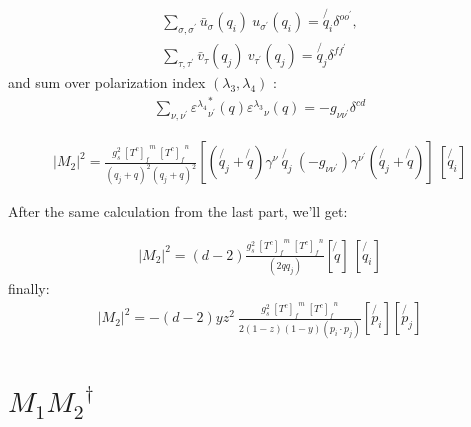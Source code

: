 \begin{equation}
\begin{split}
\displaystyle\sum\limits_{{\sigma},{\sigma}^{\prime}} {\bar{u}}_{\sigma}(q_i)\:u_{{\sigma}^{\prime}}(q_i) = \not{q_i} \delta^{{o}{o}^{\prime}},\\
\displaystyle\sum\limits_{{\tau},{\tau}^{\prime}} {\bar{v}}_{\tau}(q_j)\:v_{{\tau}^{\prime}}(q_j) = \not{q_j} \delta^{{f}{f}^{\prime}}
\end{split}
\end{equation}
and sum over polarization index $({\lambda_{3}},{\lambda}_{4})$ :
\begin{equation}
\begin{split}
 \displaystyle\sum\limits_{{\nu},{\nu}^{\prime}} {{\varepsilon^{\lambda_4}}_{{\nu}^{\prime}}^* (q) {\varepsilon^{\lambda_3}}_{\nu} (q)} = -g_{{\nu}{\nu}^{\prime}} \delta^{{c}{d}}
\end{split}
\end{equation}

\begin{equation}
\begin{split}
|M_2|^2 =\frac{g_s^2 \: {[T^c]_f}^m \: {[T^c]_{f}}^n }{(q_j + q)^2 (q_j + q)^2} [(\not{q_j} + \not{q}) \gamma^{\nu}  \:\not{q_j}\: (-g_{{\nu}{{\nu}^{\prime}}}) \gamma^{{\nu}^{\prime}}(\not{q_j} + \not{q})]\: 
[\not{q_i} ]
\end{split}
\end{equation}

After the same calculation from the last part, we'll get:

\begin{equation}
\begin{split}
|M_2|^2 =(d-2) \frac{g_s^2 \: {[T^c]_f}^m \: {[T^c]_{f}}^n }{(2qq_j)} [\not{q}]\: 
[\not{q_i} ]
\end{split}
\end{equation}
finally:
\begin{equation}
\begin{split}
|M_2|^2=-(d-2)yz^2\:\frac{g_s^2 \: {[T^c]_f}^m \: {[T^c]_{f}}^n }{2(1-z)(1-y)(p_i \cdot p_j)}
[\not{p_i}][\not{p_j}]
\end{split}
\end{equation}
\newpage



\newpage

\section{$M_1 {M_2}^{\dagger}$}

